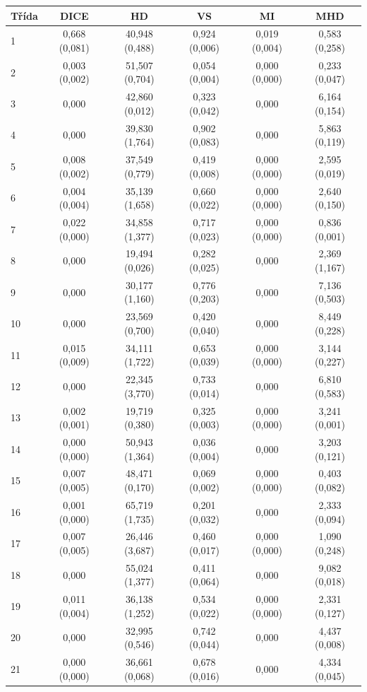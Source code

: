 \begin{tabular}{l c c c c c}
 \hline
Třída & DICE & HD & VS & MI & MHD \\ \hline
1 & 0,668 (0,081) & 40,948 (0,488) & 0,924 (0,006) & 0,019 (0,004) & 0,583 (0,258) \\
2 & 0,003 (0,002) & 51,507 (0,704) & 0,054 (0,004) & 0,000 (0,000) & 0,233 (0,047) \\
3 & 0,000 & 42,860 (0,012) & 0,323 (0,042) & 0,000 & 6,164 (0,154) \\
4 & 0,000 & 39,830 (1,764) & 0,902 (0,083) & 0,000 & 5,863 (0,119) \\
5 & 0,008 (0,002) & 37,549 (0,779) & 0,419 (0,008) & 0,000 (0,000) & 2,595 (0,019) \\
6 & 0,004 (0,004) & 35,139 (1,658) & 0,660 (0,022) & 0,000 (0,000) & 2,640 (0,150) \\
7 & 0,022 (0,000) & 34,858 (1,377) & 0,717 (0,023) & 0,000 (0,000) & 0,836 (0,001) \\
8 & 0,000 & 19,494 (0,026) & 0,282 (0,025) & 0,000 & 2,369 (1,167) \\
9 & 0,000 & 30,177 (1,160) & 0,776 (0,203) & 0,000 & 7,136 (0,503) \\
10 & 0,000 & 23,569 (0,700) & 0,420 (0,040) & 0,000 & 8,449 (0,228) \\
11 & 0,015 (0,009) & 34,111 (1,722) & 0,653 (0,039) & 0,000 (0,000) & 3,144 (0,227) \\
12 & 0,000 & 22,345 (3,770) & 0,733 (0,014) & 0,000 & 6,810 (0,583) \\
13 & 0,002 (0,001) & 19,719 (0,380) & 0,325 (0,003) & 0,000 (0,000) & 3,241 (0,001) \\
14 & 0,000 (0,000) & 50,943 (1,364) & 0,036 (0,004) & 0,000 & 3,203 (0,121) \\
15 & 0,007 (0,005) & 48,471 (0,170) & 0,069 (0,002) & 0,000 (0,000) & 0,403 (0,082) \\
16 & 0,001 (0,000) & 65,719 (1,735) & 0,201 (0,032) & 0,000 & 2,333 (0,094) \\
17 & 0,007 (0,005) & 26,446 (3,687) & 0,460 (0,017) & 0,000 (0,000) & 1,090 (0,248) \\
18 & 0,000 & 55,024 (1,377) & 0,411 (0,064) & 0,000 & 9,082 (0,018) \\
19 & 0,011 (0,004) & 36,138 (1,252) & 0,534 (0,022) & 0,000 (0,000) & 2,331 (0,127) \\
20 & 0,000 & 32,995 (0,546) & 0,742 (0,044) & 0,000 & 4,437 (0,008) \\
21 & 0,000 (0,000) & 36,661 (0,068) & 0,678 (0,016) & 0,000 & 4,334 (0,045) \\

\end{tabular}
